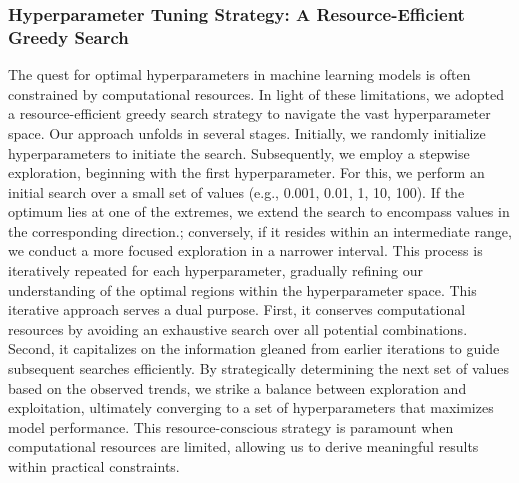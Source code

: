 

\subsubsection{Hyperparameter Tuning Strategy: A Resource-Efficient Greedy Search}

The quest for optimal hyperparameters in machine learning models is often constrained by computational resources. In light of these limitations, we adopted a resource-efficient greedy search strategy to navigate the vast hyperparameter space.
Our approach unfolds in several stages. Initially, we randomly initialize hyperparameters to initiate the search. Subsequently, we employ a stepwise exploration, beginning with the first hyperparameter. For this, we perform an initial search over a small set of values (e.g., 0.001, 0.01, 1, 10, 100). If the optimum lies at one of the extremes, we extend the search to encompass values in the corresponding direction.; conversely, if it resides within an intermediate range, we conduct a more focused exploration in a narrower interval. This process is iteratively repeated for each hyperparameter, gradually refining our understanding of the optimal regions within the hyperparameter space.
This iterative approach serves a dual purpose. First, it conserves computational resources by avoiding an exhaustive search over all potential combinations. Second, it capitalizes on the information gleaned from earlier iterations to guide subsequent searches efficiently. By strategically determining the next set of values based on the observed trends, we strike a balance between exploration and exploitation, ultimately converging to a set of hyperparameters that maximizes model performance. This resource-conscious strategy is paramount when computational resources are limited, allowing us to derive meaningful results within practical constraints.

